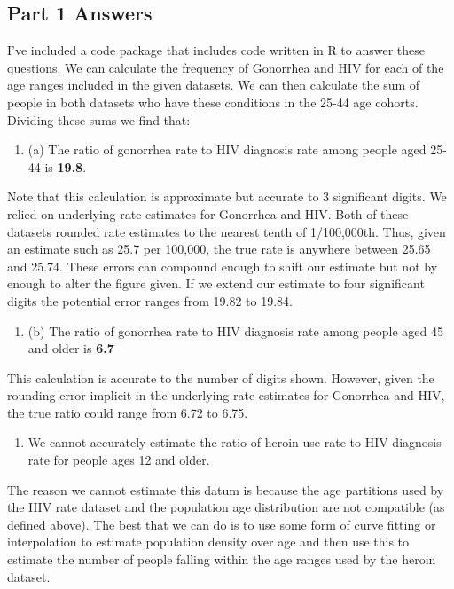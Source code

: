 \documentclass[]{article}
\begin{document}
\hypertarget{part-1-answers}{%
\subsection{Part 1 Answers}\label{part-1-answers}}

I've included a code package that includes code written in R to answer
these questions. We can calculate the frequency of Gonorrhea and HIV for
each of the age ranges included in the given datasets. We can then
calculate the sum of people in both datasets who have these conditions
in the 25-44 age cohorts. Dividing these sums we find that:

\begin{enumerate}
\def\labelenumi{\arabic{enumi}.}
\item
  (a) The ratio of gonorrhea rate to HIV diagnosis rate among people
  aged 25-44 is \textbf{19.8}.
\end{enumerate}

Note that this calculation is approximate but accurate to 3 significant
digits. We relied on underlying rate estimates for Gonorrhea and HIV.
Both of these datasets rounded rate estimates to the nearest tenth of
1/100,000th. Thus, given an estimate such as 25.7 per 100,000, the true
rate is anywhere between 25.65 and 25.74. These errors can compound
enough to shift our estimate but not by enough to alter the figure
given. If we extend our estimate to four significant digits the
potential error ranges from 19.82 to 19.84.

\begin{enumerate}
\def\labelenumi{\arabic{enumi}.}
\item
  (b) The ratio of gonorrhea rate to HIV diagnosis rate among people
  aged 45 and older is \textbf{6.7}
\end{enumerate}

This calculation is accurate to the number of digits shown. However,
given the rounding error implicit in the underlying rate estimates for
Gonorrhea and HIV, the true ratio could range from 6.72 to 6.75.

\begin{enumerate}
\def\labelenumi{\arabic{enumi}.}
\item
  We cannot accurately estimate the ratio of heroin use rate to HIV
  diagnosis rate for people ages 12 and older.
\end{enumerate}

The reason we cannot estimate this datum is because the age partitions
used by the HIV rate dataset and the population age distribution are not
compatible (as defined above). The best that we can do is to use some
form of curve fitting or interpolation to estimate population density
over age and then use this to estimate the number of people falling
within the age ranges used by the heroin dataset.
\end{document}
